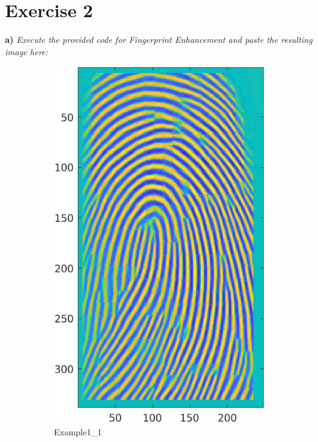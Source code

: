 \documentclass[11pt]{article}
\begin{document}
\section{Exercise 2}

\textbf{a) }\emph{Execute the provided code for Fingerprint Enhancement and paste the resulting image here:}

\begin{figure}[h!]
  \centering
       \begin{subfigure}[t]{0.45\textwidth}
         \centering
         \includegraphics[scale=0.96]{img/enhanced_1}
         \caption{Example1\_1}
     \end{subfigure}%
     \quad
     \begin{subfigure}[t]{0.45\textwidth}
         \centering

\end{subfigure}
\end{figure}
\end{document}
